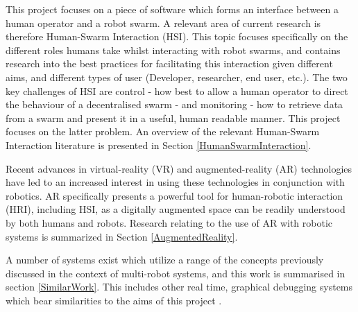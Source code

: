 This project focuses on a piece of software which forms an interface between a human operator and a robot swarm. A relevant area of current research is therefore Human-Swarm Interaction (HSI). This topic focuses specifically on the different roles humans take whilst interacting with robot swarms, and contains research into the best practices for facilitating this interaction given different aims, and different types of user (Developer, researcher, end user, etc.). The two key challenges of HSI are control - how best to allow a human operator to direct the behaviour of a decentralised swarm - and monitoring - how to retrieve data from a swarm and present it in a useful, human readable manner. This project focuses on the latter problem. An overview of the relevant Human-Swarm Interaction literature is presented in Section \ref{HumanSwarmInteraction}.

Recent advances in virtual-reality (VR) and augmented-reality (AR) technologies have led to an increased interest in using these technologies in conjunction with robotics. AR specifically presents a powerful tool for human-robotic interaction (HRI), including HSI, as a digitally augmented space can be readily understood by both humans and robots. Research relating to the use of AR with robotic systems is summarized in Section \ref{AugmentedReality}.

A number of systems exist which utilize a range of the concepts previously discussed in the context of multi-robot systems, and this work is summarised in section \ref{SimilarWork}. This includes other real time, graphical debugging systems which bear similarities to the aims of this project .


